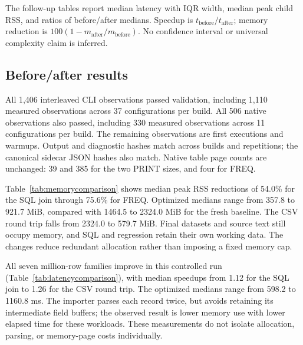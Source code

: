 \documentclass[11pt,a4paper]{article}
\begin{document}
The follow-up tables report median latency with IQR width,
median peak child RSS, and ratios of before/after medians.
Speedup is $t_{\mathrm{before}}/t_{\mathrm{after}}$; memory
reduction is $100(1-m_{\mathrm{after}}/m_{\mathrm{before}})$.
No confidence interval or universal complexity claim is inferred.

\subsection{Before/after results}

All 1,406 interleaved CLI observations passed validation, including
1,110 measured observations across 37 configurations per build.
All 506 native observations also passed, including 330 measured
observations across 11 configurations per build. The remaining
observations are first executions and warmups. Output and
diagnostic hashes match across builds and repetitions; the
canonical sidecar JSON hashes also match. Native table page
counts are unchanged: 39 and 385 for the two PRINT sizes, and
four for FREQ.

\begin{table}[tbp]
\centering\small

\caption{Million-row median peak child RSS before and after the
allocation changes; fifteen measured repetitions per build and
workload. Percentage reduction compares medians.}
\label{tab:memorycomparison}
\end{table}

Table~\ref{tab:memorycomparison} shows median peak RSS reductions
of 54.0\% for the SQL join through 75.6\% for FREQ. Optimized
medians range from 357.8 to 921.7 MiB, compared with 1464.5 to
2324.0 MiB for the fresh baseline. The CSV round trip falls from
2324.0 to 579.7 MiB. Final datasets and source text still occupy
memory, and SQL and regression retain their own working data.
The changes reduce redundant allocation rather than imposing
a fixed memory cap.

\begin{table}[tbp]
\centering\small

\caption{Million-row CLI latency in milliseconds: median (IQR
width). Speedup is the ratio of before/after medians, with
adjacent build order alternating each iteration.}
\label{tab:latencycomparison}
\end{table}

All seven million-row families improve in this controlled run
(Table~\ref{tab:latencycomparison}), with median speedups from
1.12 for the SQL join to 1.26 for the CSV round trip. The
optimized medians range from 598.2 to 1160.8 ms. The importer
parses each record twice, but avoids retaining its intermediate
field buffers; the observed result is lower memory use with
lower elapsed time for these workloads. These measurements do
not isolate allocation, parsing, or memory-page costs individually.
\end{document}
